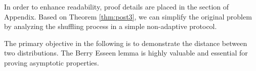 \documentclass[letterpaper]{article} %
\newtheorem{lemma}{Lemma}
\begin{document}
In order to enhance readability, proof details are placed in the section of Appendix. Based on Theorem \ref{thm:post3}, we can simplify the original problem by analyzing the shuffling process in a simple non-adaptive protocol. 

The primary objective in the following is to demonstrate the distance between two distributions. The Berry Esseen lemma \cite{berry1941accuracy,Esseen1942} is highly valuable and essential for proving asymptotic properties.
%
%
%
%
\end{document}
